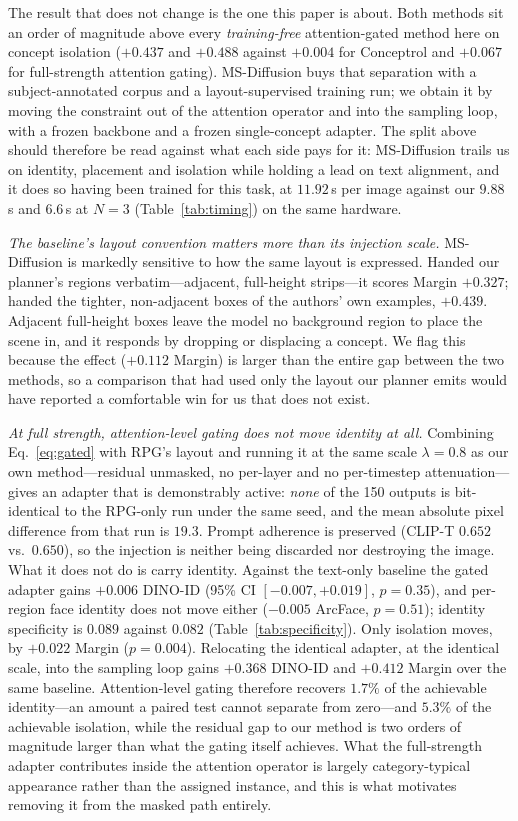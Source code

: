 \documentclass[review,10pt,times]{elsarticle}
\begin{document}
The result that does not change is the one this paper is about.  Both methods
sit an order of magnitude above every \emph{training-free} attention-gated
method here on concept isolation ($+0.437$ and $+0.488$ against $+0.004$ for
Conceptrol and $+0.067$ for full-strength attention gating).  MS-Diffusion
buys that separation with a subject-annotated corpus and a layout-supervised
training run; we obtain it by moving the constraint out of the attention
operator and into the sampling loop, with a frozen backbone and a frozen
single-concept adapter.  The split above should therefore be read against what
each side pays for it: MS-Diffusion trails us on identity, placement and
isolation while holding a lead on text alignment, and it does so having been
trained for this task, at $11.92$\,s per image against our $9.88$\,s
and $6.6$\,s at $N{=}3$ (Table~\ref{tab:timing}) on the same hardware.

\noindent\textit{The baseline's layout convention matters more than its
injection scale.}
MS-Diffusion is markedly sensitive to how the same layout is expressed.
Handed our planner's regions verbatim---adjacent, full-height strips---it
scores Margin $+0.327$; handed the tighter, non-adjacent boxes of the
authors' own examples, $+0.439$.  Adjacent full-height boxes leave the model
no background region to place the scene in, and it responds by dropping or
displacing a concept.  We flag this because the effect ($+0.112$ Margin) is
larger than the entire gap between the two methods, so a comparison that had
used only the layout our planner emits would have reported a comfortable win
for us that does not exist.

\noindent\textit{At full strength, attention-level gating does not move
identity at all.}
Combining Eq.~\ref{eq:gated} with RPG's layout and running it at the same
scale $\lambda{=}0.8$ as our own method---residual unmasked, no per-layer
and no per-timestep attenuation---gives an adapter that is demonstrably
active: \emph{none} of the 150 outputs is bit-identical to the RPG-only
run under the same seed, and the mean absolute pixel difference from that
run is $19.3$.  Prompt adherence is preserved (CLIP-T $0.652$ vs.\ $0.650$),
so the injection is neither being discarded nor destroying the image.
What it does not do is carry identity.  Against the text-only baseline the
gated adapter gains $+0.006$ DINO-ID (95\% CI $[-0.007,+0.019]$,
$p{=}0.35$), and per-region face identity does not move either
($-0.005$ ArcFace, $p{=}0.51$); identity specificity is
$0.089$ against $0.082$ (Table~\ref{tab:specificity}).  Only isolation moves,
by $+0.022$ Margin ($p{=}0.004$).  Relocating the identical adapter, at the
identical scale, into the sampling loop gains $+0.368$ DINO-ID and $+0.412$
Margin over the same baseline.  Attention-level gating therefore recovers
$1.7\%$ of the achievable identity---an amount a paired test cannot separate
from zero---and $5.3\%$ of the achievable isolation, while the residual gap
to our method is two orders of magnitude larger than what the gating itself
achieves.
What the
full-strength adapter contributes inside the attention operator is largely
category-typical appearance rather than the assigned instance, and this
is what motivates removing it from the masked path entirely.
\end{document}
